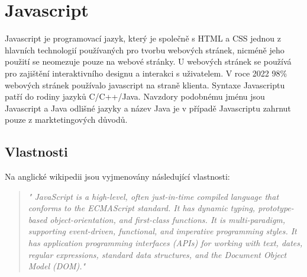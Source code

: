 \documentclass[main.tex]{subfiles}
\begin{document}
\section{Javascript}
Javascript je programovací jazyk, který je společně s HTML a CSS jednou z hlavních technologií používaných pro tvorbu webových stránek, nicméně jeho použití se neomezuje pouze na webové stránky. U webových stránek se používá pro zajištění interaktivního designu a interakci s uživatelem. V roce 2022 98\% webových stránek používalo javascript na straně klienta. Syntaxe Javascriptu patří do rodiny jazyků C/C++/Java. Navzdory podobnému jménu jsou Javascript a Java odlišné jazyky a název Java je v případě Javascriptu zahrnut pouze z marktetingových důvodů.


\subsection{Vlastnosti}
Na anglické wikipedii jsou vyjmenovány následující vlastnosti:
\begin{quote} \textit{" JavaScript is a high-level, often just-in-time compiled language that conforms to the ECMAScript standard. It has dynamic typing, prototype-based object-orientation, and first-class functions. It is multi-paradigm, supporting event-driven, functional, and imperative programming styles. It has application programming interfaces (APIs) for working with text, dates, regular expressions, standard data structures, and the Document Object Model (DOM)." } \end{quote}
\end{document}
